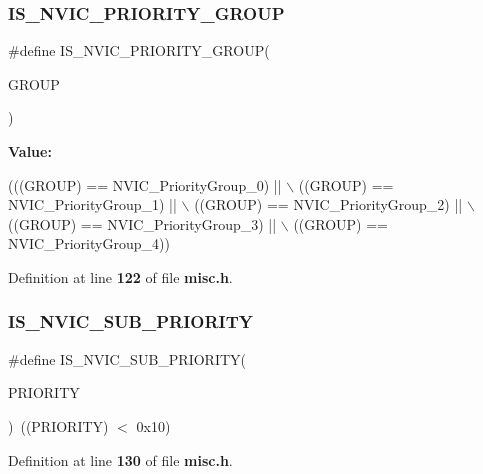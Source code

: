 \subsubsection{I\+S\+\_\+\+N\+V\+I\+C\+\_\+\+P\+R\+I\+O\+R\+I\+T\+Y\+\_\+\+G\+R\+O\+UP}
{\footnotesize\ttfamily \#define I\+S\+\_\+\+N\+V\+I\+C\+\_\+\+P\+R\+I\+O\+R\+I\+T\+Y\+\_\+\+G\+R\+O\+UP(\begin{DoxyParamCaption}\item[{}]{G\+R\+O\+UP }\end{DoxyParamCaption})}

{\bfseries Value\+:}
\begin{DoxyCode}
(((GROUP) == NVIC_PriorityGroup_0) || \(\backslash\)
                                       ((GROUP) == NVIC_PriorityGroup_1) || \(\backslash\)
                                       ((GROUP) == NVIC_PriorityGroup_2) || \(\backslash\)
                                       ((GROUP) == NVIC_PriorityGroup_3) || \(\backslash\)
                                       ((GROUP) == NVIC_PriorityGroup_4))
\end{DoxyCode}


Definition at line \textbf{ 122} of file \textbf{ misc.\+h}.

\mbox{\label{group__MISC__Preemption__Priority__Group_ga010705bc997dcff935b965b372cba61d}} 
\subsubsection{I\+S\+\_\+\+N\+V\+I\+C\+\_\+\+S\+U\+B\+\_\+\+P\+R\+I\+O\+R\+I\+TY}
{\footnotesize\ttfamily \#define I\+S\+\_\+\+N\+V\+I\+C\+\_\+\+S\+U\+B\+\_\+\+P\+R\+I\+O\+R\+I\+TY(\begin{DoxyParamCaption}\item[{}]{P\+R\+I\+O\+R\+I\+TY }\end{DoxyParamCaption})~((P\+R\+I\+O\+R\+I\+TY) $<$ 0x10)}



Definition at line \textbf{ 130} of file \textbf{ misc.\+h}.

